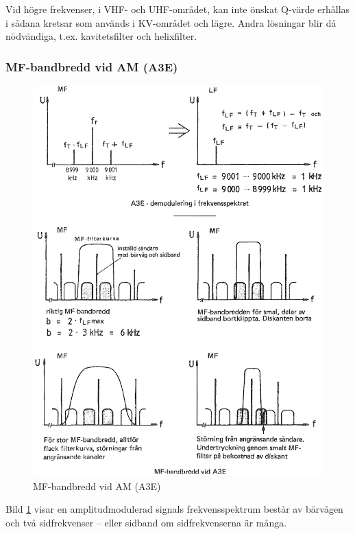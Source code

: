 Vid högre frekvenser, i VHF- och UHF-området, kan inte önskat Q-värde
erhållas i sådana kretsar som används i KV-området och lägre.
Andra lösningar blir då nödvändiga, t.ex. kavitetsfilter och helixfilter.

\subsubsection{MF-bandbredd vid AM (A3E)}

\begin{figure}
  \includegraphics[width=\textwidth]{images/cropped_pdfs/bild_2_4-26.pdf}
  \caption{MF-bandbredd vid AM (A3E)}
  \label{fig:bildII4-26}
\end{figure}

Bild \ref{fig:bildII4-26} visar en amplitudmodulerad signals frekvensspektrum
består av bärvågen och två sidfrekvenser -- eller sidband om sidfrekvenserna
är många.

